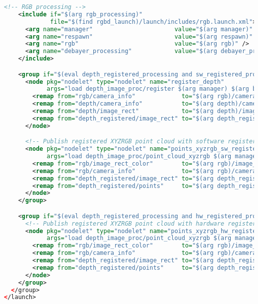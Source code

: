 \begin{lstlisting}[language=xml]
    <!-- RGB processing -->
    <include if="$(arg rgb_processing)"
             file="$(find rgbd_launch)/launch/includes/rgb.launch.xml">
      <arg name="manager"                       value="$(arg manager)" />
      <arg name="respawn"                       value="$(arg respawn)" />
      <arg name="rgb"                           value="$(arg rgb)" />
      <arg name="debayer_processing"            value="$(arg debayer_processing)" />
    </include>

    <group if="$(eval depth_registered_processing and sw_registered_processing)">
      <node pkg="nodelet" type="nodelet" name="register_depth"
            args="load depth_image_proc/register $(arg manager) $(arg bond)" respawn="$(arg respawn)">
        <remap from="rgb/camera_info"             to="$(arg rgb)/camera_info" />
        <remap from="depth/camera_info"           to="$(arg depth)/camera_info" />
        <remap from="depth/image_rect"            to="$(arg depth)/image_rect_raw" />
        <remap from="depth_registered/image_rect" to="$(arg depth_registered)/sw_registered/image_rect_raw" />
      </node>

      <!-- Publish registered XYZRGB point cloud with software registered input -->
      <node pkg="nodelet" type="nodelet" name="points_xyzrgb_sw_registered"
            args="load depth_image_proc/point_cloud_xyzrgb $(arg manager) $(arg bond)" respawn="$(arg respawn)">
        <remap from="rgb/image_rect_color"        to="$(arg rgb)/image_rect_color" />
        <remap from="rgb/camera_info"             to="$(arg rgb)/camera_info" />
        <remap from="depth_registered/image_rect" to="$(arg depth_registered_filtered)/sw_registered/image_rect_raw" />
        <remap from="depth_registered/points"     to="$(arg depth_registered)/points" />
      </node>
    </group>

    <group if="$(eval depth_registered_processing and hw_registered_processing)">
      <!-- Publish registered XYZRGB point cloud with hardware registered input (ROS Realsense depth alignment) -->
      <node pkg="nodelet" type="nodelet" name="points_xyzrgb_hw_registered"
            args="load depth_image_proc/point_cloud_xyzrgb $(arg manager) $(arg bond)" respawn="$(arg respawn)">
        <remap from="rgb/image_rect_color"        to="$(arg rgb)/image_rect_color" />
        <remap from="rgb/camera_info"             to="$(arg rgb)/camera_info" />
        <remap from="depth_registered/image_rect" to="$(arg depth_registered)/image_raw" />
        <remap from="depth_registered/points"     to="$(arg depth_registered_pub)/points" />
      </node>
    </group>
  </group>
</launch>
\end{lstlisting}

